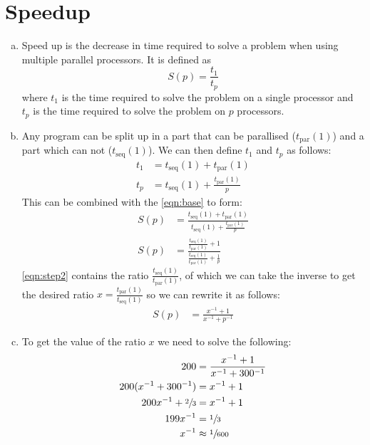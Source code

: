 \documentclass[a4paper]{article}
\begin{document}
\section{Speedup}
\begin{enumerate}[(a)]
	\item Speed up is the decrease in time required to solve a problem when using multiple parallel processors. It is defined as
		\begin{equation}
			S(p) = \frac{t_1}{t_p} \label{eqn:base}
		\end{equation}
		where $t_1$ is the time required to solve the problem on a single processor and $t_p$ is the time required to solve the problem on $p$ processors.
	\item Any program can be split up in a part that can be parallised ($t_\text{par}(1)$) and a part which can not ($t_\text{seq}(1)$). We can then define $t_1$ and $t_p$ as follows:
		\begin{align*}
			t_1 &= t_\text{seq}(1) + t_\text{par}(1) \\
			t_p &= t_\text{seq}(1) + \frac{t_\text{par}(1)}{p}
		\end{align*}
		This can be combined with the \autoref{eqn:base} to form:
		\begin{align}
			S(p) &= \frac{t_\text{seq}(1) + t_\text{par}(1)}{t_\text{seq}(1) + \frac{t_\text{par}(1)}{p}} \nonumber \\
			S(p) &= \frac{\frac{t_\text{seq}(1)}{t_\text{par}(1)} + 1}{\frac{t_\text{seq}(1)}{t_\text{par}(1)} + \frac{1}{p}} \label{eqn:step2}
		\end{align}
		\autoref{eqn:step2} contains the ratio $\displaystyle \frac{t_\text{seq}(1)}{t_\text{par}(1)}$, of which we can take the inverse to get the desired ratio $\displaystyle x = \frac{t_\text{par}(1)}{t_\text{seq}(1)}$ so we can rewrite it as follows:
		\begin{align*}
			S(p) &= \frac{x^{-1} + 1}{x^{-1} + p^{-1}}
		\end{align*}
	\item To get the value of the ratio $x$ we need to solve the following:
		\begin{align*}
			200 &= \frac{x^{-1} + 1}{x^{-1} + 300^{-1}} \\
			200 (x^{-1} + 300^{-1}) &= x^{-1} + 1 \\
			200 x^{-1} + \sfrac{2}{3} &= x^{-1} + 1 \\
			199 x^{-1} &= \sfrac{1}{3} \\
			x^{-1} &\approx \sfrac{1}{600} \\

\end{align*}
\end{enumerate}
\end{document}
